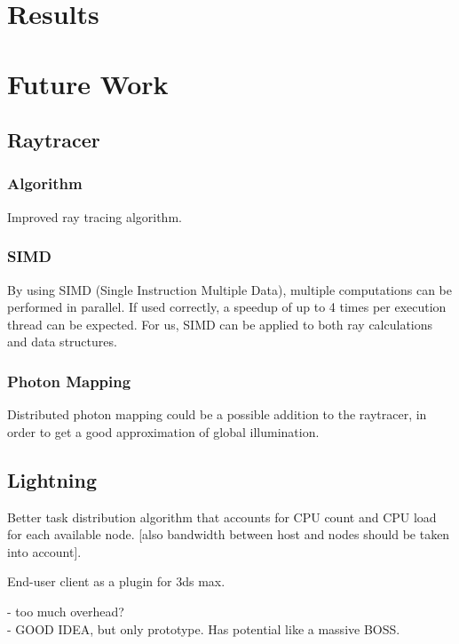 \chapter{Results}

\chapter{Future Work}
\section{Raytracer}
\subsection{Algorithm}
Improved ray tracing algorithm.

\subsection{SIMD}
By using SIMD (Single Instruction Multiple Data), multiple computations can be performed in parallel. If used correctly, a speedup of up to 4 times per execution thread can be expected. For us, SIMD can be applied to both ray calculations and data structures.

\subsection{Photon Mapping}
Distributed photon mapping could be a possible addition to the raytracer, in order to get a good approximation of global illumination.

\section{Lightning}
Better task distribution algorithm that accounts for CPU count and CPU load for each available node. [also bandwidth between host and nodes should be taken into account].

End-user client as a plugin for 3ds max.

- too much overhead?\\
- GOOD IDEA, but only prototype. Has potential like a massive BOSS.